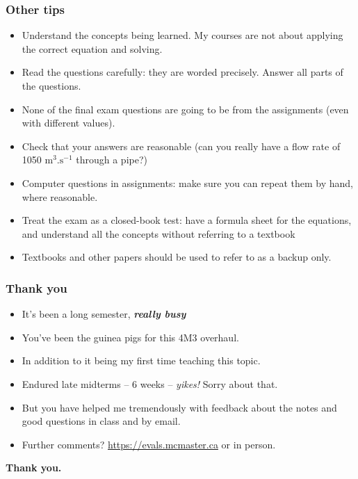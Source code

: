 \begin{frame}\frametitle{Other tips}
	\begin{itemize}
		\item	Understand the concepts being learned. My courses are not about applying the correct equation and solving.
		\item	Read the questions carefully: they are worded precisely. Answer all parts of the questions.
		\item	None of the final exam questions are going to be from the assignments (even with different values).
		\item	Check that your answers are reasonable (can you really have a flow rate of 1050 \(\text{m}^3.\text{s}^{-1}\) through a pipe?)
		\item	Computer questions in assignments: make sure you can repeat them by hand, where reasonable.
	\end{itemize}
	\begin{exampleblock}{{\color{myRed}{Most important advice}}}
		\begin{itemize}
			\item	Treat the exam as a closed-book test: have a formula sheet for the equations, and understand all the concepts without referring to a textbook
			\item	Textbooks and other papers should be used to refer to as a backup only.
		\end{itemize}
	\end{exampleblock}
\end{frame}

\begin{frame}\frametitle{Thank you}
	\begin{itemize}
		\item	It's been a long semester, \textbf{\emph{really busy}}
		\item	You've been the guinea pigs for this 4M3 overhaul.
		\item	In addition to it being my first time teaching this topic.
		\item	Endured late midterms -- 6 weeks -- \emph{yikes!} Sorry about that.
		\item	But you have helped me tremendously with feedback about the notes and good questions in class and by email.
		\item	Further comments? \href{https://evals.mcmaster.ca}{https://evals.mcmaster.ca} or in person.
	\end{itemize}
	\vspace{12pt}
	\textbf{Thank you.}
\end{frame}